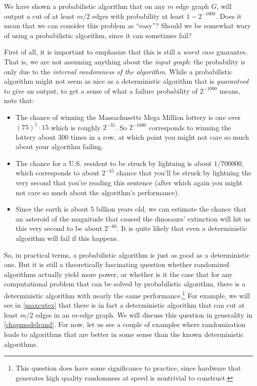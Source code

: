 We have shown a probabilistic algorithm that on any \(m\) edge graph
\(G\), will output a cut of at least \(m/2\) edges with probability at
least \(1-2^{-1000}\). Does it mean that we can consider this problem as
``easy''? Should we be somewhat wary of using a probabilistic algorithm,
since it can sometimes fail?

First of all, it is important to emphasize that this is still a
\emph{worst case} guarantee. That is, we are not assuming anything about
the \emph{input graph}: the probability is only due to the
\emph{internal randomness of the algorithm}. While a probabilistic
algorithm might not seem as nice as a deterministic algorithm that is
\emph{guaranteed} to give an output, to get a sense of what a failure
probability of \(2^{-1000}\) means, note that:

\begin{itemize}
\item
  The chance of winning the Massachusetts Mega Million lottery is one
  over \((75)^5\cdot 15\) which is roughly \(2^{-35}\). So \(2^{-1000}\)
  corresponds to winning the lottery about \(300\) times in a row, at
  which point you might not care so much about your algorithm failing.
\item
  The chance for a U.S. resident to be struck by lightning is about
  \(1/700000\), which corresponds to about \(2^{-45}\) chance that
  you'll be struck by lightning the very second that you're reading this
  sentence (after which again you might not care so much about the
  algorithm's performance).
\item
  Since the earth is about 5 billion years old, we can estimate the
  chance that an asteroid of the magnitude that caused the dinosaurs'
  extinction will hit us this very second to be about \(2^{-60}\). It is
  quite likely that even a deterministic algorithm will fail if this
  happens.
\end{itemize}

So, in practical terms, a probabilistic algorithm is just as good as a
deterministic one. But it is still a theoretically fascinating question
whether randomized algorithms actually yield more power, or whether is
it the case that for any computational problem that can be solved by
probabilistic algorithm, there is a deterministic algorithm with nearly
the same performance.\footnote{This question does have some significance
  to practice, since hardware that generates high quality randomness at
  speed is nontrivial to construct.} For example, we will see in
\cref{maxcutex} that there is in fact a deterministic algorithm that can
cut at least \(m/2\) edges in an \(m\)-edge graph. We will discuss this
question in generality in \cref{chapmodelrand}. For now, let us see a
couple of examples where randomization leads to algorithms that are
better in some sense than the known deterministic algorithms.

